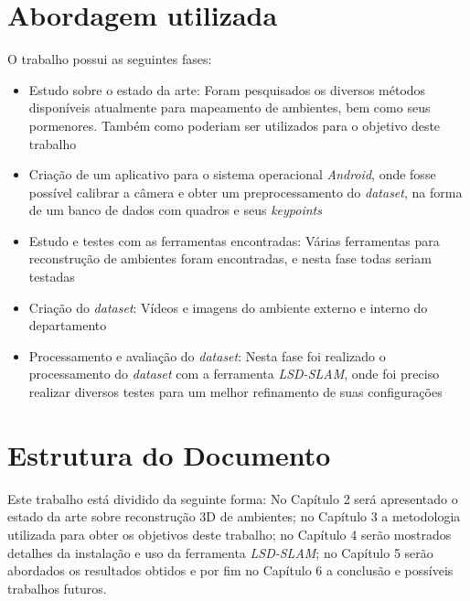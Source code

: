 \section{Abordagem utilizada}

O trabalho possui as seguintes fases:
\begin{itemize}
\item{Estudo sobre o estado da arte: Foram pesquisados os diversos métodos disponíveis atualmente para mapeamento de ambientes, bem como seus pormenores. Também como  poderiam ser utilizados para o objetivo deste trabalho}
\item{Criação de um aplicativo para o sistema operacional \textit{Android}, onde fosse possível calibrar a câmera e obter um preprocessamento do \textit{dataset}, na forma de um banco de dados com quadros e seus \textit{keypoints}}
\item{Estudo e testes com as ferramentas encontradas: Várias ferramentas para reconstrução de ambientes foram encontradas, e nesta fase todas seriam testadas}
\item{Criação do \textit{dataset}: Vídeos e imagens do ambiente externo e interno do departamento}
\item{Processamento e avaliação do \textit{dataset}: Nesta fase foi realizado o processamento do \textit{dataset} com a ferramenta \textit{LSD-SLAM}, onde foi preciso realizar diversos testes para um melhor refinamento de suas configurações}
\end{itemize}


\section{Estrutura do Documento}


Este trabalho está dividido da seguinte forma: No Capítulo 2 será apresentado o estado da arte sobre reconstrução 3D de ambientes; no Capítulo 3 a metodologia utilizada para obter os objetivos deste trabalho; no Capítulo 4 serão mostrados detalhes da instalação e uso da ferramenta \textit{LSD-SLAM}; no Capítulo 5 serão abordados os resultados obtidos e por fim no Capítulo 6 a conclusão e possíveis trabalhos futuros.

